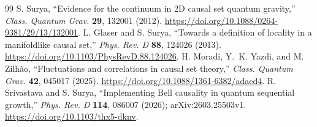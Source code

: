 \documentclass[11pt,a4paper]{article}
\begin{document}
\begin{thebibliography}{99}
 S. Surya, ``Evidence for the continuum in 2D causal set quantum gravity,'' \emph{Class. Quantum Grav.} \textbf{29}, 132001 (2012). \url{https://doi.org/10.1088/0264-9381/29/13/132001}.
 L. Glaser and S. Surya, ``Towards a definition of locality in a manifoldlike causal set,'' \emph{Phys. Rev. D} \textbf{88}, 124026 (2013). \url{https://doi.org/10.1103/PhysRevD.88.124026}.
 H. Moradi, Y.~K. Yazdi, and M. Zilh\~ao, ``Fluctuations and correlations in causal set theory,'' \emph{Class. Quantum Grav.} \textbf{42}, 045017 (2025). \url{https://doi.org/10.1088/1361-6382/adacd4}.
 R. Srivastava and S. Surya, ``Implementing Bell causality in quantum sequential growth,'' \emph{Phys. Rev. D} \textbf{114}, 086007 (2026); arXiv:2603.25503v1. \url{https://doi.org/10.1103/thx5-dknv}.
\end{thebibliography}
\end{document}
